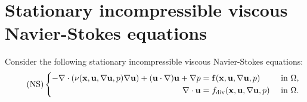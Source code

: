 \documentclass[oneside]{book}
\numberwithin{equation}{section}
\begin{document}
\section{Stationary incompressible viscous Navier-Stokes equations}
Consider the following stationary incompressible viscous Navier-Stokes equations:
\begin{equation}
    \label{stationary incompressible viscous NSEs}
    \tag{NS}
    \left\{\begin{split}
        -\nabla\cdot\left(\nu({\bf x},{\bf u},\nabla{\bf u},p)\nabla{\bf u}\right) + ({\bf u}\cdot\nabla){\bf u} + \nabla p &= {\bf f}({\bf x},{\bf u},\nabla{\bf u},p) &&\mbox{ in } \Omega,\\
        \nabla\cdot{\bf u} &= f_{\rm div}({\bf x},{\bf u},\nabla{\bf u},p) &&\mbox{ in } \Omega.
    \end{split}\right.
\end{equation}
\end{document}
